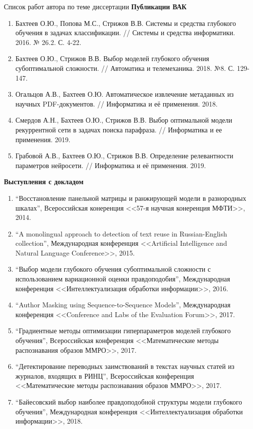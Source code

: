 \documentclass[usenames,dvipsnames,11pt,pdf,utf8,russian,aspectratio=43]{beamer}
\begin{document}
\begin{frame}{Список работ автора по теме диссертации}
\tiny
\textbf{Публикации ВАК}
\begin{enumerate}
\item Бахтеев О.Ю., Попова М.С., Стрижов В.В. Системы и средства глубокого обучения в задачах классификации. // Системы и средства информатики. 2016. № 26.2. С. 4-22.
\item Бахтеев О.Ю., Стрижов В.В. Выбор моделей глубокого обучения субоптимальной сложности. // Автоматика и телемеханика. 2018. №8. С. 129-147.
\item Огальцов А.В., Бахтеев О.Ю. Автоматическое извлечение метаданных из научных PDF-документов. // Информатика и её применения. 2018.
\item Смердов А.Н., Бахтеев О.Ю., Стрижов В.В. Выбор оптимальной модели рекуррентной сети в задачах поиска парафраза. // Информатика и ее применения. 2019.
\item Грабовой А.В., Бахтеев О.Ю., Стрижов В.В. Определение релевантности параметров нейросети. // Информатика и её применения. 2019.
\end{enumerate}
\textbf{Выступления с докладом}
\begin{enumerate}
\item ``Восстановление панельной матрицы и ранжирующей модели в разнородных шкалах'', Всероссийская конеренция <<57-я научная конеренция МФТИ>>, 2014.
\item ``A monolingual approach to detection of text reuse in Russian-English collection'', Международная конференция <<Artificial Intelligence and Natural Language Conference>>, 2015.
\item ``Выбор модели глубокого обучения субоптимальной сложности с использованием вариационной оценки правдоподобия'', Международная конференция <<Интеллектуализация обработки информации>>, 2016.
\item ``Author Masking using Sequence-to-Sequence Models'', Международная конференция <<Conference and Labs of the Evaluation Forum>>, 2017.
\item ``Градиентные методы оптимизации гиперпараметров моделей глубокого обучения'', Всероссийская конференция <<Математические методы распознавания образов ММРО>>, 2017.
\item ``Детектирование переводных заимствований в текстах научных статей из журналов, входящих в РИНЦ'', Всероссийская конференция <<Математические методы распознавания образов ММРО>>, 2017.
\item ``Байесовский выбор наиболее правдоподобной структуры модели глубокого обучения'', Международная конференция <<Интеллектуализация обработки информации>>, 2018.
\end{enumerate}
\end{frame}
\end{document}
